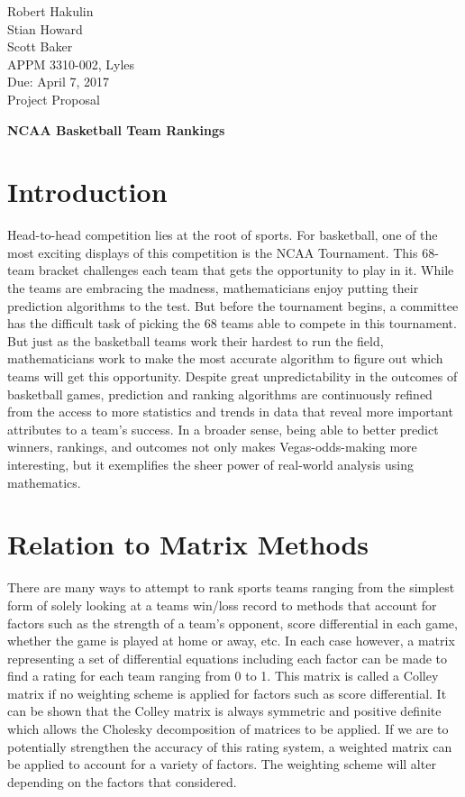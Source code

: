 \documentclass{article}
\begin{document}
\begin{flushleft}
\noindent
Robert Hakulin\\
Stian Howard\\
Scott Baker\\
APPM 3310-002, Lyles\\
Due: April 7, 2017\\
Project Proposal\\
\end{flushleft}
\begin{center}
\textbf{\Large{NCAA Basketball Team Rankings}}
\end{center}
\section{Introduction}
Head-to-head competition lies at the root of sports. For basketball, one of the most exciting displays of this competition is the NCAA Tournament. This 68-team bracket challenges each team that gets the opportunity to play in it. While the teams are embracing the madness, mathematicians enjoy putting their prediction algorithms to the test. But before the tournament begins, a committee has the difficult task of picking the 68 teams able to compete in this tournament. But just as the basketball teams work their hardest to run the field, mathematicians work to make the most accurate algorithm to figure out which teams will get this opportunity. Despite great unpredictability in the outcomes of basketball games, prediction and ranking algorithms are continuously refined from the access to more statistics and trends in data that reveal more important attributes to a team's success. In a broader sense, being able to better predict winners, rankings, and outcomes not only makes Vegas-odds-making more interesting, but it exemplifies the sheer power of real-world analysis using mathematics.
\section{Relation to Matrix Methods}
There are many ways to attempt to rank sports teams ranging from the simplest form of solely looking at a teams win/loss record to methods that account for factors such as the strength of a team's opponent, score differential in each game, whether the game is played at home or away, etc. In each case however, a matrix representing a set of differential equations including each factor can be made to find a rating for each team ranging from 0 to 1. This matrix is called a Colley matrix if no weighting scheme is applied for factors such as score differential. It can be shown that the Colley matrix is always symmetric and positive definite which allows the Cholesky decomposition of matrices to be applied. If we are to potentially strengthen the accuracy of this rating system, a weighted matrix can be applied to account for a variety of factors. The weighting scheme will alter depending on the factors that considered. 
\end{document}
